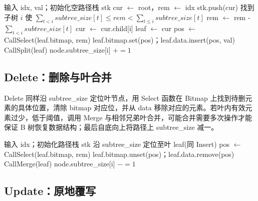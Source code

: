\begin{algorithm}[htbp]
  \caption{MiniArray.Insert}
  \label{alg:miniarray-insert}
  \begin{algorithmic}[1]
    \State 输入 idx, val；初始化空路径栈 stk
    \State cur $\gets$ root，rem $\gets$ idx
      \State stk.push(cur)
      \State 找到子树 $i$ 使 $\displaystyle\sum_{t<i}\mathit{subtree\_size}[t]\le \mathit{rem}<\sum_{t\le i}\mathit{subtree\_size}[t]$
      \State rem $\gets$ rem - $\displaystyle\sum_{t<i}\mathit{subtree\_size}[t]$
      \State cur $\gets$ cur.child[i]
    \EndWhile
    \State leaf $\gets$ cur
    \State pos $\gets$ Call{Select}(leaf.bitmap, rem)
    \State leaf.bitmap.set(pos)；leaf.data.insert(pos, val)
      \State Call{Split}(leaf)
    \EndIf
      \State node.subtree\_size[i] $\mathrel{+}=1$
    \EndFor
  \end{algorithmic}
\end{algorithm}

\subsection{Delete：删除与叶合并}

Delete 同样沿 subtree\_size 定位叶节点，用 Select 函数在 Bitmap 上找到待删元素的具体位置，清除 bitmap 对应位，并从 data 移除对应的元素。若叶内有效元素过少，低于阈值，调用 Merge 与相邻兄弟叶合并，可能合并需要多次操作才能保证 B 树恢复数据结构；最后自底向上将路径上 subtree\_size 减一。

\begin{algorithm}[htbp]
  \caption{MiniArray.Delete}
  \label{alg:miniarray-delete}
  \begin{algorithmic}[1]
    \State 输入 idx；初始化路径栈 stk
    \State 沿 subtree\_size 定位至叶 leaf(同 Insert)
    \State pos $\gets$ Call{Select}(leaf.bitmap, rem)
    \State leaf.bitmap.unset(pos)；leaf.data.remove(pos)
      \State Call{Merge}(leaf)
    \EndIf
      \State node.subtree\_size[i] $\mathrel{-}=1$
    \EndFor
  \end{algorithmic}
\end{algorithm}

\subsection{Update：原地覆写}

